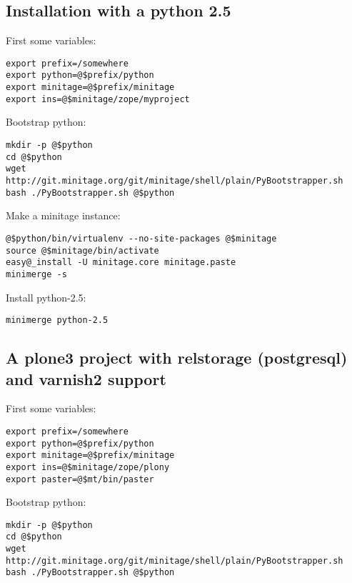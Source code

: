 \documentclass[letterpaper,10pt,english]{sphinxmanual}
\begin{document}
\subsection{Installation with a python 2.5}
\label{usecases/install25:installation-with-a-python-2-5}\label{usecases/install25::doc}
First some variables:

\begin{Verbatim}[commandchars=@\[\]]
export prefix=/somewhere
export python=@$prefix/python
export minitage=@$prefix/minitage
export ins=@$minitage/zope/myproject
\end{Verbatim}

Bootstrap python:

\begin{Verbatim}[commandchars=@\[\]]
mkdir -p @$python
cd @$python
wget http://git.minitage.org/git/minitage/shell/plain/PyBootstrapper.sh
bash ./PyBootstrapper.sh @$python
\end{Verbatim}

Make a minitage instance:

\begin{Verbatim}[commandchars=@\[\]]
@$python/bin/virtualenv --no-site-packages @$minitage
source @$minitage/bin/activate
easy@_install -U minitage.core minitage.paste
minimerge -s
\end{Verbatim}

Install python-2.5:

\begin{Verbatim}[commandchars=@\[\]]
minimerge python-2.5
\end{Verbatim}


\subsection{A plone3 project with relstorage (postgresql) and varnish2 support}
\label{usecases/plone3:a-plone3-project-with-relstorage-postgresql-and-varnish2-support}\label{usecases/plone3::doc}
First some variables:

\begin{Verbatim}[commandchars=@\[\]]
export prefix=/somewhere
export python=@$prefix/python
export minitage=@$prefix/minitage
export ins=@$minitage/zope/plony
export paster=@$mt/bin/paster
\end{Verbatim}

Bootstrap python:

\begin{Verbatim}[commandchars=@\[\]]
mkdir -p @$python
cd @$python
wget http://git.minitage.org/git/minitage/shell/plain/PyBootstrapper.sh
bash ./PyBootstrapper.sh @$python
\end{Verbatim}
\end{document}
